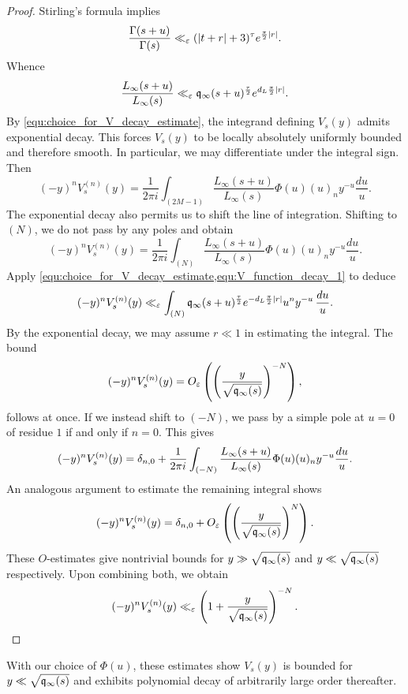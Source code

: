 \documentclass[12pt]{article}
\begin{document}
    \begin{proof}
      Stirling's formula implies
      \[
        \frac{\Gamma(s+u)}{\Gamma(s)} \ll_{\varepsilon} (|t+r|+3)^{\tau}e^{\frac{\pi}{2}|r|}.
      \]
      Whence
      \begin{equation}\label{equ:V_function_decay_1}
        \frac{L_{\infty}(s+u)}{L_{\infty}(s)} \ll_{\varepsilon} \mathfrak{q}_{\infty}(s+u)^{\frac{\tau}{2}}e^{d_{L}\frac{\pi}{2}|r|}.
      \end{equation}
      By \cref{equ:choice_for_V_decay_estimate}, the integrand defining \(V_{s}(y)\) admits exponential decay. This forces \(V_{s}(y)\) to be locally absolutely uniformly bounded and therefore smooth. In particular, we may differentiate under the integral sign. Then
      \[
        (-y)^{n}V_{s}^{(n)}(y) = \frac{1}{2\pi i}\int_{(2M-1)}\frac{L_{\infty}(s+u)}{L_{\infty}(s)}\Phi(u)(u)_{n}y^{-u}\frac{du}{u}.
      \]
      The exponential decay also permits us to shift the line of integration. Shifting to \((N)\), we do not pass by any poles and obtain
      \[
        (-y)^{n}V_{s}^{(n)}(y) = \frac{1}{2\pi i}\int_{(N)}\frac{L_{\infty}(s+u)}{L_{\infty}(s)}\Phi(u)(u)_{n}y^{-u}\frac{du}{u}.
      \]
      Apply \cref{equ:choice_for_V_decay_estimate,equ:V_function_decay_1} to deduce
      \[
        (-y)^{n}V_{s}^{(n)}(y) \ll_{\varepsilon} \int_{(N)}\mathfrak{q}_{\infty}(s+u)^{\frac{\tau}{2}}e^{-d_{L}\frac{\pi}{2}|r|}u^{n}y^{-u}\,\frac{du}{u}.
      \]
      By the exponential decay, we may assume \(r \ll 1\) in estimating the integral. The bound
      \[
        (-y)^{n}V_{s}^{(n)}(y) = O_{\varepsilon}\left(\left(\frac{y}{\sqrt{\mathfrak{q}_{\infty}(s)}}\right)^{-N}\right),
      \]
      follows at once. If we instead shift to \((-N)\), we pass by a simple pole at \(u = 0\) of residue \(1\) if and only if \(n = 0\). This gives
      \[
        (-y)^{n}V_{s}^{(n)}(y) = \delta_{n,0}+\frac{1}{2\pi i}\int_{(-N)}\frac{L_{\infty}(s+u)}{L_{\infty}(s)}\Phi(u)(u)_{n}y^{-u}\frac{du}{u}.
      \]
      An analogous argument to estimate the remaining integral shows
      \[
        (-y)^{n}V_{s}^{(n)}(y) = \delta_{n,0}+O_{\varepsilon}\left(\left(\frac{y}{\sqrt{\mathfrak{q}_{\infty}(s)}}\right)^{N}\right).
      \]
      These \(O\)-estimates give nontrivial bounds for \(y \gg \sqrt{\mathfrak{q}_{\infty}(s)}\) and \(y \ll \sqrt{\mathfrak{q}_{\infty}(s)}\) respectively. Upon combining both, we obtain
      \[
        (-y)^{n}V_{s}^{(n)}(y) \ll_{\varepsilon} \left(1+\frac{y}{\sqrt{\mathfrak{q}_{\infty}(s)}}\right)^{-N}.
      \]
    \end{proof}

    With our choice of \(\Phi(u)\), these estimates show \(V_{s}(y)\) is bounded for \(y \ll \sqrt{\mathfrak{q}_{\infty}(s)}\) and exhibits polynomial decay of arbitrarily large order thereafter.
    
\end{document}
